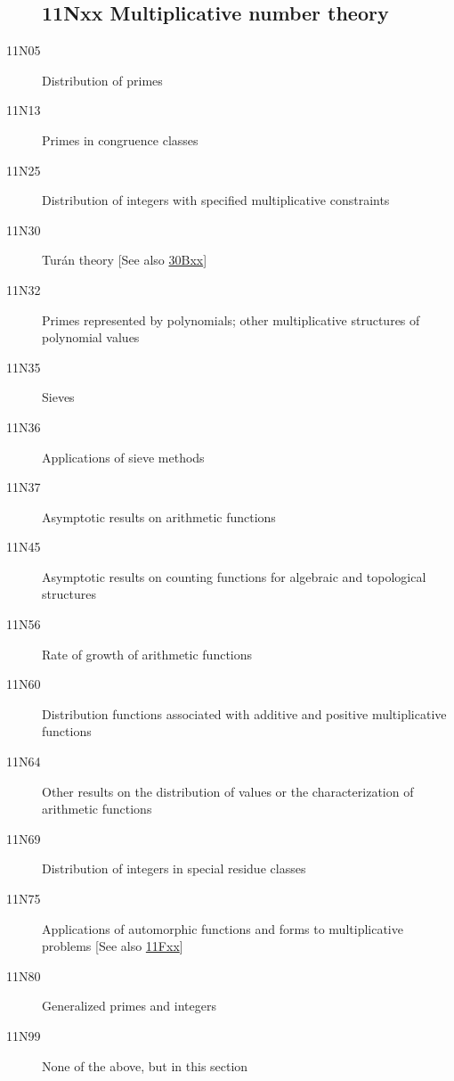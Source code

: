 \documentclass[letterpaper]{article}
\begin{document}
\begin{description}
\subsection*{11Nxx  Multiplicative number theory }\label{11Nxx}
\item [11N05]\label{11N05} Distribution of primes
\item [11N13]\label{11N13} Primes in congruence classes
\item [11N25]\label{11N25} Distribution of integers with specified multiplicative constraints
\item [11N30]\label{11N30} Tur\'{a}n theory [See also \hyperref[30Bxx]{30Bxx}]
\item [11N32]\label{11N32} Primes represented by polynomials; other multiplicative structures of polynomial values
\item [11N35]\label{11N35} Sieves
\item [11N36]\label{11N36} Applications of sieve methods
\item [11N37]\label{11N37} Asymptotic results on arithmetic functions
\item [11N45]\label{11N45} Asymptotic results on counting functions for algebraic and topological structures
\item [11N56]\label{11N56} Rate of growth of arithmetic functions
\item [11N60]\label{11N60} Distribution functions associated with additive and positive multiplicative functions
\item [11N64]\label{11N64} Other results on the distribution of values or the characterization of arithmetic functions
\item [11N69]\label{11N69} Distribution of integers in special residue classes
\item [11N75]\label{11N75} Applications of automorphic functions and forms to multiplicative problems [See also \hyperref[11Fxx]{11Fxx}]
\item [11N80]\label{11N80} Generalized primes and integers
\item [11N99]\label{11N99} None of the above, but in this section
\end{description}
\end{document}
